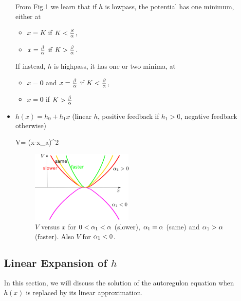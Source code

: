 \begin{itemize}
From Fig.\ref{fig-v-low-high-pass}
we learn that if $h$ is lowpass, the potential has one minimum, 
either at 

\begin{itemize}[$\checkmark$]
\item $x=K$ if $K<\frac{\beta}{\alpha}$,

\item $x=\frac{\beta}{\alpha}$ if $K>\frac{\beta}{\alpha}$.

\end{itemize}

If instead, $h$ is highpass, it has one or two minima, at

\begin{itemize}[$\checkmark$]
\item $x=0$ and $x=\frac{\beta}{\alpha}$ if $K<\frac{\beta}{\alpha}$,

\item $x=0$ if $K>\frac{\beta}{\alpha}$

\end{itemize}

\item $h(x)=h_0 + h_1x$ (linear $h$, positive feedback if $h_1>0$,
negative feedback otherwise)

\beq
V= (x-x_a)^2
\eeq

\begin{figure}[h!]
\centering
\includegraphics[width=2in]
{autoregulons/v-faster-same-slower.png}
\caption{$V$ versus $x$ for 
$0<\alpha_1<\alpha$ (slower),
$\alpha_1=\alpha$ (same) and
$\alpha_1>\alpha$ (faster).
Also $V$ for $\alpha_1<0$.}
\label{fig-v-low-high-pass}
\end{figure}
 
\end{itemize}

\subsection{Linear Expansion of $h$}

In this section, we will
discuss the solution of
the autoregulon equation
when $h(x)$ is replaced by
its linear approximation.

